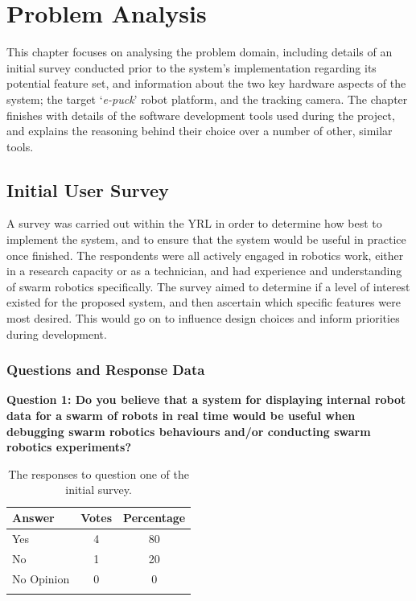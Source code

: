 \chapter[Problem Analysis]{Problem Analysis} %

\label{ChapterProblemAnalysis} %

This chapter focuses on analysing the problem domain, including details of an initial survey conducted prior to the system's implementation regarding its potential feature set, and information about the two key hardware aspects of the system; the target `\textit{e-puck}' robot platform, and the tracking camera. The chapter finishes with details of the software development tools used during the project, and explains the reasoning behind their choice over a number of other, similar tools.


\section{Initial User Survey} \label{InitialUserSurvey}

A survey was carried out within the YRL in order to determine how best to implement the system, and to ensure that the system would be useful in practice once finished. The respondents were all actively engaged in robotics work, either in a research capacity or as a technician, and had experience and understanding of swarm robotics specifically. The survey aimed to determine if a level of interest existed for the proposed system, and then ascertain which specific features were most desired. This would go on to influence design choices and inform priorities during development.


\subsection{Questions and Response Data}
\noindent\textbf{Question 1: Do you believe that a system for displaying internal robot data for a swarm of robots in real time would be useful when debugging swarm robotics behaviours and/or conducting swarm robotics experiments?}

\begin{longtable}{ l c c }
 \textbf{Answer} & \textbf{Votes} & \textbf{Percentage} \\ 
 \hline
 Yes & 4 & 80 \\ 
 No & 1 & 20 \\
 No Opinion & 0 & 0 \\
 \bottomrule
 \caption[Initial Survey Question 1 Responses]{The responses to question one of the initial survey.}
 \label{tab:QuestionOneData}
\end{longtable}

